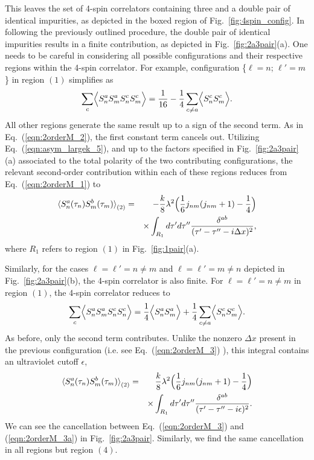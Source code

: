 \documentclass[aps,prb,twocolumn,superscriptaddress]{revtex4-1}
\begin{document}
This leaves the set of 4-spin correlators containing three and a double pair of identical impurities, as depicted in the boxed region of Fig.~\ref{fig:4spin_config}. In following the previously outlined procedure, the double pair of identical impurities results in a finite contribution, as depicted in Fig.~\ref{fig:2a3pair}(a). One needs to be careful in considering all possible configurations and their respective regions within the 4-spin correlator. For example, configuration \{$\ell=n$; $\ell'=m$\} in region $(1)$ simplifies as
\begin{eqnarray}
\sum_{c}\Bigl\langle{S^{a}_{n}S^{a}_{m}S^{c}_{n}S^{c}_{m}\Bigr\rangle}=\frac{1}{16}-\frac{1}{4}\sum_{c\ne a}\Bigl\langle{S^{c}_{n}S^{c}_{m}\Bigr\rangle}. \label{eqn:2orderM_2a}
\end{eqnarray}
All other regions generate the same result up to a sign of the second term. As in Eq.~(\ref{eqn:2orderM_2}), the first constant term cancels out. Utilizing Eq.~(\ref{eqn:asym_largek_5}), and up to the factors specified in Fig.~\ref{fig:2a3pair}(a) associated to the total polarity of the two contributing configurations, the relevant second-order contribution within each of these regions reduces from Eq.~(\ref{eqn:2orderM_1}) to 
\begin{eqnarray}
\braket{S^{a}_{n}(\tau_{n})S^{b}_{m}(\tau_{m})}_{(2)}&=&-\frac{k}{8}\lambda^{2}\Bigl(\frac{1}{6}j_{nm}(j_{nm}+1)-\frac{1}{4}\Bigr) \label{eqn:2orderM_3} \\ 
&&\times\int_{R_{1}} d\tau'd\tau''\frac{\delta^{ab}}{(\tau'-\tau''-i\Delta{x})^{2}}, \nonumber 
\end{eqnarray}
where $R_{1}$ refers to region $(1)$ in Fig.~\ref{fig:1pair}(a). 

Similarly, for the cases $\ell=\ell'=n\ne m$ and $\ell=\ell'=m\ne n$ depicted in Fig.~\ref{fig:2a3pair}(b), the 4-spin correlator is also finite. For $\ell=\ell'=n\ne m$ in region $(1)$, the 4-spin correlator reduces to
\begin{align}
\sum_{c}\Bigl\langle{S^{a}_{n}S^{a}_{m}S^{c}_{n}S^{c}_{n}\Bigr\rangle}=\frac{1}{4}\Bigl\langle{S^{a}_{n}S^{a}_{m}\Bigr\rangle}+\frac{1}{4}\sum_{c\ne a}\Bigl\langle{S^{c}_{n}S^{c}_{m}\Bigr\rangle}. \label{eqn:2orderM_3aa}
\end{align}
As before, only the second term contributes. Unlike the nonzero $\Delta{x}$ present in the previous configuration (i.e. see Eq.~(\ref{eqn:2orderM_3}) ), this integral contains an ultraviolet cutoff $\epsilon$,
\begin{eqnarray}
\braket{S^{a}_{n}(\tau_{n})S^{b}_{m}(\tau_{m})}_{(2)}&=&\frac{k}{8}\lambda^{2}\Bigl(\frac{1}{6}j_{nm}(j_{nm}+1)-\frac{1}{4}\Bigr) \label{eqn:2orderM_3a} \\ 
&&\times\int_{R_{1}}d\tau'd\tau''\frac{\delta^{ab}}{(\tau'-\tau''-i\epsilon)^{2}}. \nonumber
\end{eqnarray}
We can see the cancellation between Eq.~(\ref{eqn:2orderM_3}) and (\ref{eqn:2orderM_3a}) in Fig.~\ref{fig:2a3pair}. Similarly, we find the same cancellation in all regions but region $(4)$. 
\end{document}
